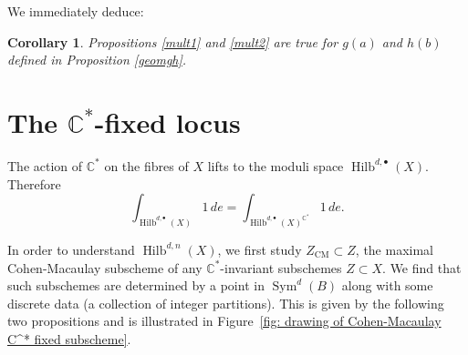 \documentclass{amsart}
\newtheorem{corollary}[theorem]{Corollary}
\theoremstyle{definition}
\newcommand{\CC} {\mathbb{C}}          %
\newcommand{\Sym}{\operatorname{Sym}}
\newcommand{\Hilb}{\operatorname{Hilb}}
\newcommand{\CM}{\operatorname{CM}}
\begin{document}
We immediately deduce:  
\begin{corollary} 
Propositions \ref{mult1} and \ref{mult2} are true for $g(a)$ and $h(b)$ defined in Proposition \ref{geomgh}.
\end{corollary}   
   


\section{The $\CC^*$-fixed locus} \label{fixedlocus}

The action of $\CC^*$ on the fibres of $X$ lifts to the moduli space
$\Hilb^{d,\bullet}(X)$. Therefore
$$
\int_{\Hilb^{d,\bullet}(X)} 1 \, de = \int_{\Hilb^{d,\bullet}(X)^{\CC^*}} 1 \, de.
$$

In order to understand $\Hilb^{d,n}(X)$, we first study
$Z_{\CM}\subset Z$, the maximal Cohen-Macaulay subscheme of any
$\CC^{*}$-invariant subschemes $Z\subset X$. We find that such
subschemes are determined by a point in $\Sym^{d}(B)$ along with some
discrete data (a collection of integer partitions). This is given by
the following two propositions and is illustrated in Figure~\ref{fig: drawing of Cohen-Macaulay C^* fixed subscheme}.
\end{document}
